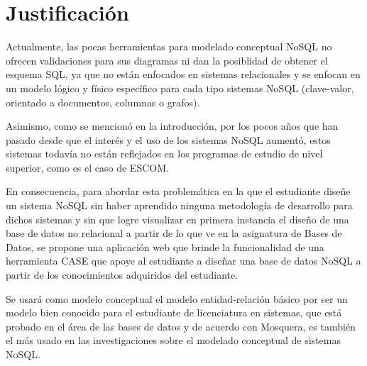 \section{Justificación}

Actualmente, las pocas herramientas para modelado conceptual NoSQL no ofrecen validaciones para sus diagramas ni dan la posiblidad de obtener el esquema SQL, ya que no están enfocados en sistemas relacionales y se enfocan en un modelo lógico y físico específico para cada tipo sistemas NoSQL (clave-valor, orientado a documentos, columnas o grafos).


Asimismo, como se mencionó en la introducción, por los pocos años que han pasado desde que el interés y el uso de los sistemas NoSQL aumentó, estos sistemas todavía no están reflejados en los programas de estudio de nivel superior, como es el caso de ESCOM.


En consecuencia, para abordar esta problemática en la que el estudiante diseñe un sistema NoSQL sin haber aprendido ninguna metodología de desarrollo para dichos sistemas y sin que logre visualizar en primera instancia el diseño de una base de datos no relacional a partir de lo que ve en la asignatura de Bases de Datos, se propone una aplicación web que brinde la funcionalidad de una herramienta CASE que apoye al estudiante a diseñar una base de datos NoSQL a partir de los conocimientos adquiridos del estudiante.


Se usará como modelo conceptual el modelo entidad-relación básico por ser un modelo bien conocido para el estudiante de licenciatura en sistemas, que está probado en el área de las bases de datos y de acuerdo con Mosquera\cite{martinez-mosquera_modeling_2020}, es también el más usado en las investigaciones sobre el modelado conceptual de sistemas NoSQL.

